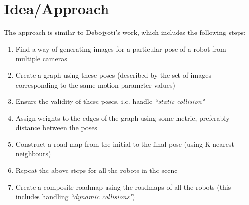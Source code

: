 \documentclass[12pt]{article}
\begin{document}
\section{Idea/Approach}
The approach is similar to Debojyoti's work, which includes the following steps:
\begin{enumerate}
  \item Find a way of generating images for a particular pose of a robot from multiple cameras
  \item Create a graph using these poses (described by the set of images corresponding to the same motion parameter values)
  \item Ensure the validity of these poses, i.e. handle \textit{``static collision"}
  \item Assign weights to the edges of the graph using some metric, preferably distance between the poses
  \item Construct a road-map from the initial to the final pose (using K-nearest neighbours)
  \item Repeat the above steps for all the robots in the scene
    \item Create a composite roadmap using the roadmaps of all the robots (this includes handling \textit{``dynamic collisions"})
\end{enumerate}

\end{document}
